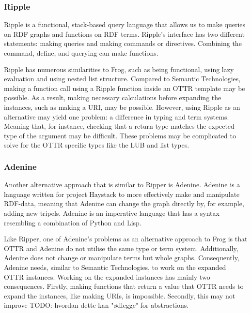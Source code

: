 \subsubsection{Ripple}
Ripple is a functional, stack-based query language that allows us to make queries on RDF graphs and functions on RDF terms. Ripple's interface has two different statements: making queries and making commands or directives. Combining the command, define, and querying can make functions.  

\para
Ripple has numerous similarities to Frog, such as being functional, using lazy evaluation and using nested list structure. Compared to Semantic Technologies, making a function call using a Ripple function inside an OTTR template may be possible. As a result, making necessary calculations before expanding the instances, such as making a URI, may be possible. However, using Ripple as an alternative may yield one problem: a difference in typing and term systems. Meaning that, for instance, checking that a return type matches the expected type of the argument may be difficult. These problems may be complicated to solve for the OTTR specific types like the LUB and list types.     

\subsubsection{Adenine}
Another alternative approach that is similar to Ripper is Adenine. Adenine is a language written for project Haystack to more effectively make and manipulate RDF-data, meaning that Adenine can change the graph directly by, for example, adding new tripels. Adenine is an imperative language that has a syntax resembling a combination of Python and Lisp.

\para
Like Ripper, one of Adenine's problems as an alternative approach to Frog is that OTTR and Adenine do not utilise the same type or term system. Additionally, Adenine does not change or manipulate terms but whole graphs. Consequently, Adenine needs, similar to Semantic Technologies, to work on the expanded OTTR instances. Working on the expanded instances has mainly two consequences. Firstly, making functions that return a value that OTTR needs to expand the instances, like making URIs, is impossible. Secondly, this may not improve   TODO: hvordan dette kan "ødlegge" for abstractions.

